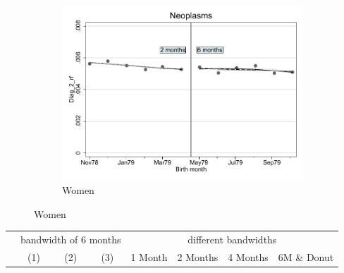 \documentclass[a4paper ]{article}
\begin{document}
\begin{figure}[h]
\begin{subfigure}[t]{0.31\textwidth}
		\centering
		\includegraphics[width=0.99\textwidth]{R1_RD_Diag_2_rf_fits}
		\caption{Women}
	\end{subfigure}
\end{figure}


\begin{table}[h]\centering
\def\sym#1{\ifmmode^{#1}\else\(^{#1}\)\fi}
\begin{tabular}{l*{3}{c}|cccc}
\toprule
&\multicolumn{3}{c}{bandwidth of 6 months} & \multicolumn{4}{c}{different bandwidths} \\
 \cmidrule(lr{1em}){2-4} \cmidrule(lr{1em}){5-8}
 &\multicolumn{1}{c}{(1)}&\multicolumn{1}{c}{(2)}&\multicolumn{1}{c}{(3)}& 1 Month & 2 Months & 4 Months & 6M \& Donut \\
\midrule 

\bottomrule
\end{tabular}
\end{table}
\end{document}
